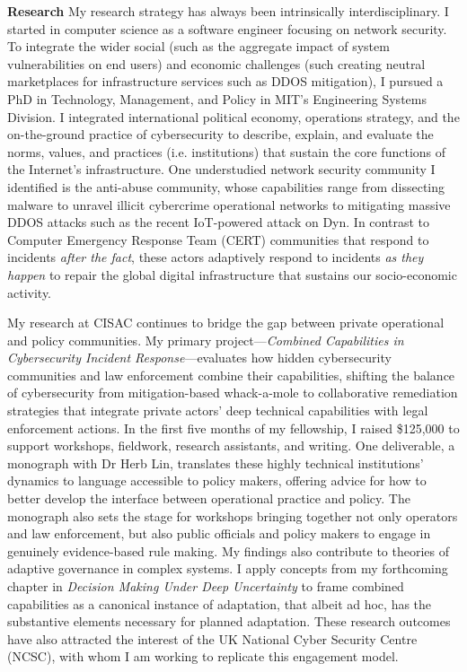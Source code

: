 \documentclass[11pt]{letter}
\begin{document}
\begin{letter}
\textbf{Research} \vspace{0.2 \baselineskip} \newline 
My research strategy has always been intrinsically interdisciplinary. 
%
I started in computer science as a software engineer focusing on
network security. 
%
To integrate the wider social (such as the aggregate impact of system
vulnerabilities on end users) and economic challenges (such creating
neutral marketplaces for infrastructure services such as DDOS
mitigation), I pursued a PhD in Technology, Management, and Policy in
MIT's Engineering Systems Division. 
%
I integrated international political economy, operations strategy, and
the on-the-ground practice of cybersecurity to describe, explain, and
evaluate the norms, values, and practices (i.e. institutions) that
sustain the core functions of the Internet's infrastructure. 
%
One understudied network security community I identified is the
anti-abuse community, whose capabilities range from dissecting malware
to unravel illicit cybercrime operational networks to mitigating massive DDOS
attacks such as the recent IoT-powered attack on Dyn. 
%
In contrast to Computer Emergency Response Team (CERT) communities
that respond to incidents \emph{after the fact}, these actors 
adaptively respond to incidents \emph{as they happen} to repair the global digital infrastructure that sustains our socio-economic activity. 


My research at CISAC continues to bridge the gap between private
operational and policy communities. 
%
My primary project---\emph{Combined Capabilities in Cybersecurity Incident
Response}---evaluates how  hidden
cybersecurity communities and law enforcement combine their
capabilities, shifting the balance of cybersecurity from
mitigation-based whack-a-mole to collaborative remediation strategies 
that integrate private actors' deep technical capabilities
with legal enforcement actions. 
%
In the first five months of my fellowship, I raised \$125,000 to
support workshops, fieldwork, research assistants, and writing. 
%
One deliverable, a monograph with Dr Herb Lin, translates these
highly technical institutions' dynamics to language accessible
to policy makers, offering advice for how to better develop the
interface between 
operational practice and policy. 
%
The monograph also sets the stage for workshops bringing together
not only operators and law enforcement, but also public officials and
policy makers to engage in genuinely evidence-based rule making. 
%
My findings also contribute to theories of adaptive
governance in complex systems. 
%
I apply concepts from my
forthcoming chapter in \emph{Decision Making Under Deep Uncertainty}
to frame combined capabilities as a canonical 
instance of adaptation, that albeit ad hoc, has the substantive
elements necessary for planned adaptation. 
%
These research outcomes have also attracted the interest of the UK
National Cyber Security Centre (NCSC), with whom I am working to
replicate this engagement model. 
 

\end{letter}
\end{document}
